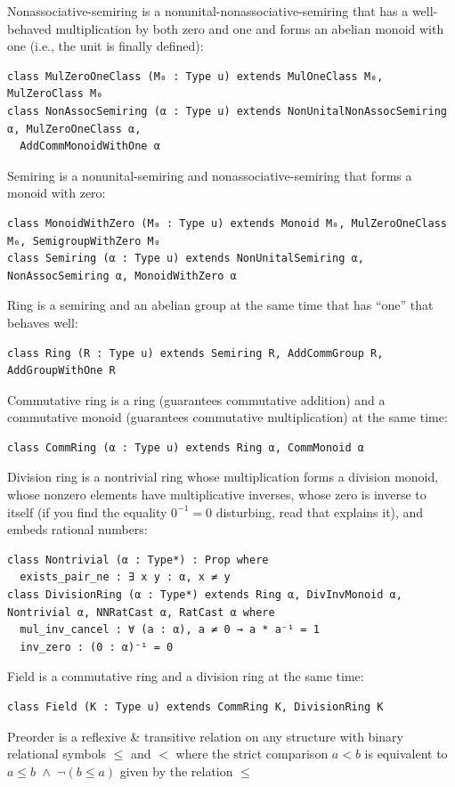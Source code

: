 \documentclass[]{article}
\renewcommand{\.}{\hskip .75pt}
\DeclareMathOperator{\aand}{\;\wedge\;}
\begin{document}
Nonassociative-semiring is a nonunital-nonassociative-semiring that has a well-behaved multiplication
by both zero and one and forms an abelian monoid with one (i.e., the unit is finally defined):
\begin{lstlisting}
class MulZeroOneClass (M₀ : Type u) extends MulOneClass M₀, MulZeroClass M₀
class NonAssocSemiring (α : Type u) extends NonUnitalNonAssocSemiring α, MulZeroOneClass α,
  AddCommMonoidWithOne α
\end{lstlisting}
Semiring is a nonunital-semiring and nonassociative-semiring that forms a monoid with zero:
\begin{lstlisting}
class MonoidWithZero (M₀ : Type u) extends Monoid M₀, MulZeroOneClass M₀, SemigroupWithZero M₀
class Semiring (α : Type u) extends NonUnitalSemiring α, NonAssocSemiring α, MonoidWithZero α
\end{lstlisting}
Ring is a semiring and an abelian group at the same time that has ``one'' that behaves well:
\begin{lstlisting}
class Ring (R : Type u) extends Semiring R, AddCommGroup R, AddGroupWithOne R
\end{lstlisting}
Commutative ring is a ring (guarantees commutative addition) and a commutative monoid
(guarantees commutative multiplication) at the same time:
\begin{lstlisting}
class CommRing (α : Type u) extends Ring α, CommMonoid α
\end{lstlisting}
Division ring is a nontrivial ring whose multiplication forms a division monoid, whose nonzero elements have
multiplicative inverses, whose zero is inverse to itself
(if you find the equality $0^{-1}\!=\!0$ disturbing, read \cite{DivBy0} that explains it),
and embeds rational numbers:
\begin{lstlisting}
class Nontrivial (α : Type*) : Prop where
  exists_pair_ne : ∃ x y : α, x ≠ y
class DivisionRing (α : Type*) extends Ring α, DivInvMonoid α, Nontrivial α, NNRatCast α, RatCast α where
  mul_inv_cancel : ∀ (a : α), a ≠ 0 → a * a⁻¹ = 1
  inv_zero : (0 : α)⁻¹ = 0
\end{lstlisting}
Field is a commutative ring and a division ring at the same time:
\begin{lstlisting}
class Field (K : Type u) extends CommRing K, DivisionRing K
\end{lstlisting}
Preorder is a reflexive \& transitive relation on any structure with binary relational symbols $\le$ and $<$
where the strict comparison $a < b$ is equivalent to $a \le b \aand \neg (b \le a)$ given by the relation $\le$
\end{document}
